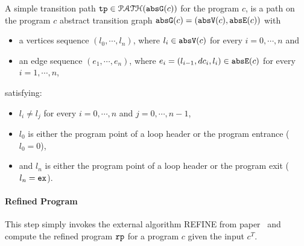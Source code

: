   \begin{defn}
    \label{def:tpath}
  A simple transition path
  $\mathtt{tp} \in \mathcal{PATH}(\mathtt{abs}{\mathtt{G}}(c))$ for the program $c$, is a path on the program $c$ abstract transition graph $\mathtt{abs}{\mathtt{G}}(c) = (\mathtt{abs}{\mathtt{V}}(c), \mathtt{abs}{\mathtt{E}}(c))$ with 
  \begin{itemize}
  \item a vertices sequence $(l_0, \cdots, l_n)$, where $l_i \in \mathtt{abs}{\mathtt{V}}(c)$ for every $i = 0, \cdots, n$ and
  \item an edge sequence $(e_1, \cdots, e_n)$, where $e_i = (l_{i - 1}, dc_i, l_{i}) \in \mathtt{abs}{\mathtt{E}}(c)$ for every $i = 1, \cdots, n$,
  \end{itemize}
  satisfying:
  \begin{itemize}
    \item $l_i \neq l_j$ for every $i = 0, \cdots, n$ and $j = 0, \cdots, {n - 1}$,
    \item $l_0$ is either the program point of a loop header or the program entrance ($l_0 = 0$),
    \item and $l_n$ is either the program point of a loop header or the program exit ($l_n = \mathtt{ex}$).
  \end{itemize}
  \end{defn}

\paragraph{Refined Program}
This step simply invokes the external algorithm REFINE from paper~\cite{GulwaniJK09} and compute the 
refined program $\mathtt{rp}$ for a program $c$ given the input $c^{T}$.
